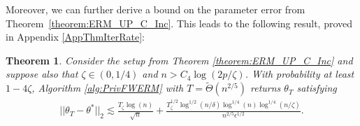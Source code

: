 \documentclass{article}
\newtheorem{theorem}{Theorem}
\begin{document}
Moreover, we can further derive a bound on the parameter error from Theorem~\ref{theorem:ERM_UP_C_Inc}. This leads to the following result, proved in Appendix \ref{AppThmIterRate}:

\begin{theorem}
\label{theorem:Iter_Rate_Inc_C}
Consider the setup from Theorem \ref{theorem:ERM_UP_C_Inc} and suppose also that $\zeta \in (0, 1/4)$ and $n > C_4 \log(2p/\zeta)$.
With probability at least $1 - 4\zeta$, Algorithm \ref{alg:PrivFWERM} with $T = \widetilde{\Theta}\left(n^{2/5}\right)$ returns $\theta_T$ satisfying
\begin{align*}
||\theta_T - \theta^*||_2 \lesssim \frac{T_\zeta\log(n)}{\sqrt{n}} + \frac{T_\zeta^{1/2}\log^{1/2}(n/\delta)\log^{1/4}(n)\log^{1/4}(n/\zeta)}{n^{2/5}\epsilon^{1/2}}.
\end{align*}
\end{theorem}
\end{document}
